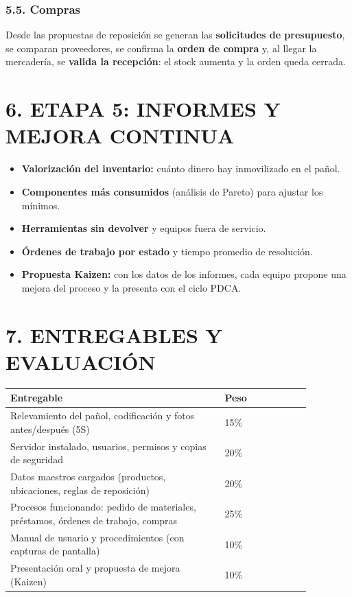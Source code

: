 \subsubsection*{5.5. Compras}
Desde las propuestas de reposición se generan las \textbf{solicitudes de presupuesto}, se
comparan proveedores, se confirma la \textbf{orden de compra} y, al llegar la mercadería, se
\textbf{valida la recepción}: el stock aumenta y la orden queda cerrada.

\section*{6. ETAPA 5: INFORMES Y MEJORA CONTINUA}

\begin{itemize}
  \item \textbf{Valorización del inventario:} cuánto dinero hay inmovilizado en el pañol.
  \item \textbf{Componentes más consumidos} (análisis de Pareto) para ajustar los mínimos.
  \item \textbf{Herramientas sin devolver} y equipos fuera de servicio.
  \item \textbf{Órdenes de trabajo por estado} y tiempo promedio de resolución.
  \item \textbf{Propuesta Kaizen:} con los datos de los informes, cada equipo propone una mejora
        del proceso y la presenta con el ciclo PDCA.
\end{itemize}

\section*{7. ENTREGABLES Y EVALUACIÓN}

\begin{center}
\small
\begin{tabular}{|p{0.62\linewidth}|p{0.25\linewidth}|}
\hline
\textbf{Entregable} & \textbf{Peso} \\ \hline
Relevamiento del pañol, codificación y fotos antes/después (5S) & 15\% \\ \hline
Servidor instalado, usuarios, permisos y copias de seguridad & 20\% \\ \hline
Datos maestros cargados (productos, ubicaciones, reglas de reposición) & 20\% \\ \hline
Procesos funcionando: pedido de materiales, préstamos, órdenes de trabajo, compras & 25\% \\ \hline
Manual de usuario y procedimientos (con capturas de pantalla) & 10\% \\ \hline
Presentación oral y propuesta de mejora (Kaizen) & 10\% \\ \hline
\end{tabular}
\end{center}


